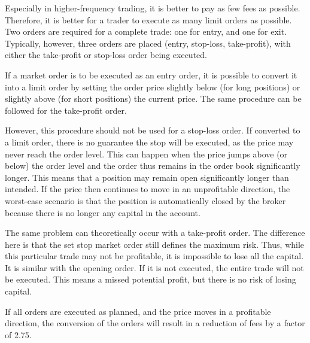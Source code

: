 Especially in higher-frequency trading, it is better to pay as few fees as possible.
Therefore, it is better for a trader to execute as many limit orders as possible.
Two orders are required for a complete trade: one for entry, and one for exit.
Typically, however, three orders are placed (entry, stop-loss, take-profit), with either the take-profit or stop-loss order being executed.

If a market order is to be executed as an entry order, it is possible to convert it into a limit order by setting the order price slightly below (for long positions) or slightly above (for short positions) the current price.
The same procedure can be followed for the take-profit order.

However, this procedure should not be used for a stop-loss order.
If converted to a limit order, there is no guarantee the stop will be executed, as the price may never reach the order level.
This can happen when the price jumps above (or below) the order level and the order thus remains in the order book significantly longer.
This means that a position may remain open significantly longer than intended.
If the price then continues to move in an unprofitable direction, the worst-case scenario is that the position is automatically closed by the broker because there is no longer any capital in the account.

The same problem can theoretically occur with a take-profit order.
The difference here is that the set stop market order still defines the maximum risk.
Thus, while this particular trade may not be profitable, it is impossible to lose all the capital.
It is similar with the opening order.
If it is not executed, the entire trade will not be executed.
This means a missed potential profit, but there is no risk of losing capital.

If all orders are executed as planned, and the price moves in a profitable direction, the conversion of the orders will result in a reduction of fees by a factor of 2.75.